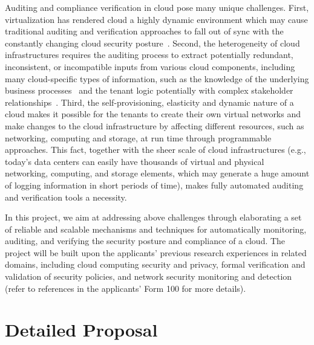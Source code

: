 \documentclass[12pt]{article}
\begin{document}
Auditing and compliance verification in cloud pose many unique
challenges. First, virtualization has rendered cloud a highly dynamic
environment which may cause traditional auditing and verification
approaches to fall out of sync with the constantly changing cloud
security posture~\cite{Doelitzscher}. Second, the heterogeneity of
cloud infrastructures requires the auditing process to extract
potentially redundant, inconsistent, or incompatible inputs from
various cloud components, including many cloud-specific types of
information, such as the knowledge of the underlying business
processes~\cite{Doelitzscher} and the tenant logic potentially with
complex stakeholder relationships~\cite{TaheriMonfared}. Third, the
self-provisioning, elasticity and dynamic nature of a cloud makes it
possible for the tenants to create their own virtual networks and make
changes to the cloud infrastructure by affecting different resources,
such as networking, computing and storage, at run time through
programmable approaches. This fact, together with the sheer scale of
cloud infrastructures (e.g., today's data centers can easily have
thousands of virtual and physical networking, computing, and storage
elements, which may generate a huge amount of logging information in
short periods of time), makes fully automated auditing and
verification tools a necessity.


In this project, we aim at addressing above challenges through
elaborating a set of reliable and scalable mechanisms and techniques
for automatically monitoring, auditing, and verifying the security
posture and compliance of a cloud. The project will be built upon the
applicants' previous research experiences in related domains,
including cloud computing security and privacy, formal verification
and validation of security policies, and network security monitoring
and detection (refer to references in the applicants' Form 100 for
more details).

\vspace{-3mm}

\section{Detailed Proposal}
\label{sec:det}
\vspace{-3mm}
\end{document}
